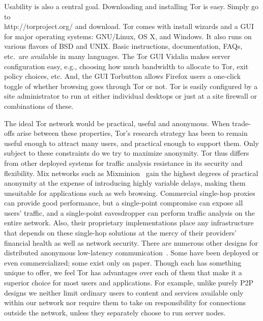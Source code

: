 \documentclass{llncs}
\begin{document}
Usability is also a central goal. Downloading and installing Tor is
easy. Simply go to\\
http://torproject.org/ and download.  Tor comes with install
wizards and a GUI for major operating systems: GNU/Linux, OS X, and
Windows. It also runs on various flavors of BSD and UNIX\@. Basic
instructions, documentation, FAQs, etc.\ are available in many
languages. The Tor GUI Vidalia makes server configuration easy, e.g.,
choosing how much bandwidth to allocate to Tor, exit policy choices,
etc. And, the GUI Torbutton allows Firefox users a one-click toggle of
whether browsing goes through Tor or not.  Tor is easily configured by
a site administrator to run at either individual desktops or just at a
site firewall or combinations of these.

The ideal Tor network would be practical, useful and anonymous. When
trade-offs arise between these properties, Tor's research strategy has
been to remain useful enough to attract many users, and practical
enough to support them.  Only subject to these constraints do we try
to maximize anonymity.  Tor thus differs from other deployed systems
for traffic analysis resistance in its security and flexibility.  Mix
networks such as
Mixminion~\cite{minion-design} gain the highest degrees of practical
anonymity at the expense of introducing highly variable delays, making
them unsuitable for applications such as web browsing.  Commercial
single-hop proxies~\cite{anonymizer} can provide good performance, but
a single-point compromise can expose all users' traffic, and a
single-point eavesdropper can perform traffic analysis on the entire
network.  Also, their proprietary implementations place any
infrastructure that depends on these single-hop solutions at the mercy
of their providers' financial health as well as network security.
There are numerous other designs for distributed anonymous low-latency
communication~\cite{crowds-tissec,web-mix,freedom21-security,i2p,tarzan:ccs02,morphmix:fc04}.
Some have been deployed or even commercialized; some exist only on
paper. Though each has something unique to offer, we feel Tor has
advantages over each of them that make it a superior choice for most
users and applications. For example, unlike purely P2P designs we
neither limit ordinary users to content and services available only
within our network nor require them to take on responsibility for
connections outside the network, unless they separately choose to run
server nodes.
\end{document}
